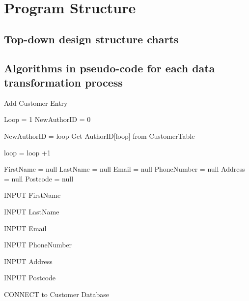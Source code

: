 \section{Program Structure}

\subsection{Top-down design structure charts}

%

\subsection{Algorithms in pseudo-code for each data transformation process}

\begin{algorithm}[H]
    \caption{Add Customer Entry}
\begin{algorithmic}[1]

Loop = 1
NewAuthorID = 0


    NewAuthorID = loop
    Get AuthorID[loop] from CustomerTable


        loop = loop +1

    \Else


    \EndIf
\EndWhile

FirstName = null
LastName = null
Email = null
PhoneNumber = null
Address = null
Postcode = null


    INPUT FirstName

\EndWhile


    INPUT LastName

\EndWhile


    INPUT Email

\EndWhile


    INPUT PhoneNumber

\EndWhile


    INPUT Address

\EndWhile


    INPUT Postcode

\EndWhile


    CONNECT to Customer Database

\EndIf
\EndFunction
\end{algorithmic}
\end{algorithm}

